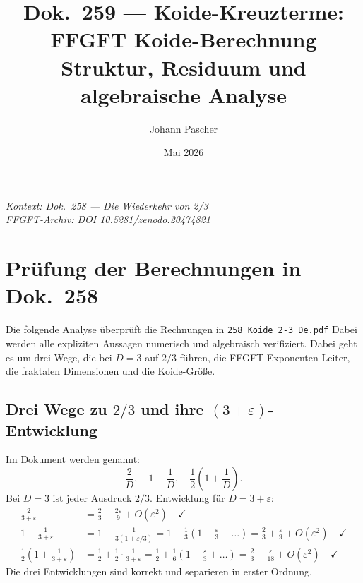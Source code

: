 
\title{Dok.~259 — Koide-Kreuzterme:\\
FFGFT Koide-Berechnung\\[0.5em]
\large Struktur, Residuum und algebraische Analyse}
\author{Johann Pascher}
\date{Mai 2026}
\maketitle

\begin{center}
\textit{Kontext: Dok.~258 — Die Wiederkehr von 2/3} \\[2pt]
\textit{FFGFT-Archiv: DOI 10.5281/zenodo.20474821}
\end{center}

\tableofcontents
\newpage

\section{Prüfung der Berechnungen in Dok.~258}

Die folgende Analyse überprüft die Rechnungen in \texttt{258\_Koide\_2-3\_De.pdf}
Dabei werden alle expliziten Aussagen numerisch und algebraisch verifiziert.
Dabei geht es um drei Wege, die bei $D=3$ auf $2/3$ führen,
die FFGFT-Exponenten-Leiter, die fraktalen Dimensionen und die Koide-Größe.

\subsection{Drei Wege zu $2/3$ und ihre $(3+\varepsilon)$-Entwicklung}

Im Dokument werden genannt:
\[
  \frac{2}{D}, \quad 1-\frac{1}{D}, \quad
  \frac{1}{2}\!\left(1+\frac{1}{D}\right).
\]
Bei $D=3$ ist jeder Ausdruck $2/3$.
Entwicklung für $D=3+\varepsilon$:
\begin{align*}
\frac{2}{3+\varepsilon} &= \frac{2}{3}-\frac{2\varepsilon}{9}+O(\varepsilon^2) \quad\checkmark \\[4pt]
1-\frac{1}{3+\varepsilon} &= 1-\frac{1}{3(1+\varepsilon/3)}
  = 1-\tfrac{1}{3}(1-\tfrac{\varepsilon}{3}+\ldots)
  = \frac{2}{3}+\frac{\varepsilon}{9}+O(\varepsilon^2) \quad\checkmark \\[4pt]
\frac{1}{2}\!\left(1+\frac{1}{3+\varepsilon}\right)
  &= \frac{1}{2}+\frac{1}{2}\cdot\frac{1}{3+\varepsilon}
  = \frac{1}{2}+\frac{1}{6}(1-\tfrac{\varepsilon}{3}+\ldots)
  = \frac{2}{3}-\frac{\varepsilon}{18}+O(\varepsilon^2) \quad\checkmark
\end{align*}
Die drei Entwicklungen sind korrekt und separieren in erster Ordnung.

